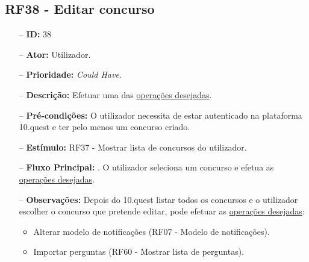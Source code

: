 \subsection{RF38 - Editar concurso}
\begin{itemize}
	\item[--] \textbf{ID:} 38
	\item[--]  \textbf{Ator:} Utilizador.
	\item[--]  \textbf{Prioridade:} \textit{Could Have}.
	\item[--]  \textbf{Descrição:} Efetuar uma das \underline{operações desejadas}.
	\item[--]  \textbf{Pré-condições:} O utilizador necessita de estar autenticado na plataforma 10.quest e ter pelo menos um concurso criado.
	\item[--]  \textbf{Estímulo:} RF37 - Mostrar lista de concursos do utilizador.
	\item[--]  \textbf{Fluxo Principal:} 
		. O utilizador seleciona um concurso e efetua as \underline{operações desejadas}.
	\item[--]  \textbf{Observações:} Depois do 10.quest listar todos os concursos e o utilizador escolher o concurso que pretende editar, pode efetuar as \underline{operações desejadas}:
	\begin{itemize}
		\item Alterar modelo de notificações (RF07 - Modelo de notificações).
		\item Importar perguntas (RF60 - Mostrar lista de perguntas).
	\end{itemize}
\end{itemize}
\newpage

